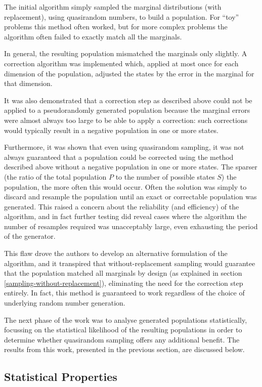 \documentclass{JASSS}
\begin{document}
The initial algorithm simply sampled the marginal distributions (with
replacement), using quasirandom numbers, to build a population. For
``toy'' problems this method often worked, but for more complex problems
the algorithm often failed to exactly match all the marginals.

In general, the resulting population mismatched the marginals only
slightly. A correction algorithm was implemented which, applied at most
once for each dimension of the population, adjusted the states by the
error in the marginal for that dimension. 

It was also demonstrated that a correction step as described above could
not be applied to a pseudorandomly generated population because the
marginal errors were almost always too large to be able to apply a
correction: such corrections would typically result in a negative
population in one or more states.

Furthermore, it was shown that even using quasirandom sampling, it was
not always guaranteed that a population could be corrected using the
method described above without a negative population in one or more
states. The sparser (the ratio of the total population \(P\) to the
number of possible states \(S\)) the population, the more often this
would occur. Often the solution was simply to discard and resample the
population until an exact or correctable population was generated. This
raised a concern about the reliability (and efficiency) of the
algorithm, and in fact further testing did reveal cases where the
algorithm the number of resamples required was unacceptably large, even
exhausting the period of the generator.

This flaw drove the authors to develop an alternative formulation
of the algorithm, and it transpired that without-replacement sampling
would guarantee that the population matched all marginals by design (as
explained in section \ref{sampling-without-replacement}), eliminating the need for the correction step
entirely. In fact, this method is guaranteed to work regardless of the
choice of underlying random number generation.

The next phase of the work was to analyse generated populations
statistically, focussing on the statistical likelihood of the resulting populations in order to determine whether quasirandom sampling offers any additional benefit.
The results from this work, presented in the previous section, are
discussed below.

\subsection{Statistical Properties}\label{statistical-properties-1}
\end{document}

